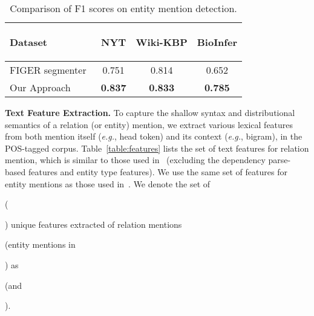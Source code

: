 \documentclass[letterpaper]{sig-alternate-2013}
\def\eg{{\sl e.g.}}
\begin{document}
\begin{table}[t]
\begin{scriptsize}
\begin{center}
\begin{tabularx}{0.8\linewidth}{l|ccc}
\hline
\begin{scriptsize}
\textbf{Dataset}\end{scriptsize} & \begin{scriptsize}
\textbf{NYT}\end{scriptsize}  & \begin{scriptsize}\textbf{Wiki-KBP}\end{scriptsize} & \begin{scriptsize}\textbf{BioInfer}\end{scriptsize}\\ \hline
FIGER segmenter~\cite{ling2012fine} & 0.751 & 0.814 & 0.652 \\
Our Approach & \textbf{0.837} & \textbf{0.833} & \textbf{0.785} \\
\hline
\end{tabularx}
\caption{Comparison of F1 scores on entity mention detection.}
\label{table:entity_detection}
\end{center}
\end{scriptsize}
\end{table}



\smallskip
\noindent 
\textsf{\small\textbf{Text Feature Extraction.}}
To capture the shallow syntax and distributional semantics
of a relation (or entity) mention, we extract various lexical features from both mention itself (\eg, head token) and its context  (\eg, bigram), in the POS-tagged corpus. Table~\ref{table:features} lists the set of text features for relation mention, which is similar to those used in~\cite{mintz2009distant,chan2010exploiting} (excluding the dependency parse-based features and entity type features). We use the same set of features for entity mentions as those used in~\cite{ren2016label,ling2012fine}.
We denote the set of \begin{small}\end{small} (\begin{small}\end{small}) unique features extracted of relation mentions \begin{small}\end{small} (entity mentions in \begin{small}\end{small}) as \begin{small}\end{small} \big(and \begin{small}\end{small}\big).
\end{document}

